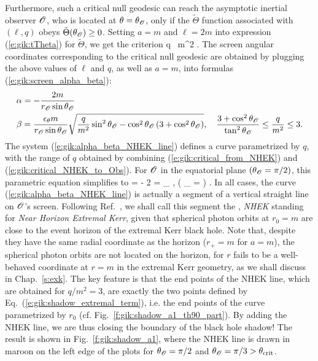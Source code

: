 Furthermore, such a critical null geodesic can reach the asymptotic inertial
observer $\mathscr{O}$, who is located at $\theta = \theta_{\mathscr{O}}$, only if the
$\tilde{\Theta}$ function associated with $(\ell,q)$ obeys $\tilde{\Theta}(\theta_{\mathscr{O}}) \geq 0$.
Setting $a=m$ and $\ell=2m$ into expression (\ref{e:gik:tTheta}) for $\tilde{\Theta}$,
we get the criterion
\be \label{e:gik:critical_NHEK_to_Obs}
    q \geq {} \, m^2 .
\ee
The screen angular coordinates corresponding to the critical null geodesic
are obtained by plugging the
above values of $\ell$ and $q$, as well as $a=m$, into formulas (\ref{e:gik:screen_alpha_beta}):
\begin{subequations}
\label{e:gik:alpha_beta_NHEK_line}
\begin{align}
& \alpha = - \frac{2 m}{r_{\mathscr{O}}\sin\theta_{\mathscr{O}}}  \\
&  \beta = \frac{\epsilon_\theta m}{r_{\mathscr{O}}\sin\theta_{\mathscr{O}}} \sqrt{ \frac{q}{m^2}\sin^2\theta_{\mathscr{O}}
 - \cos^2\theta_{\mathscr{O}} \left( 3 + \cos^2\theta_{\mathscr{O}} \right)  },
 \quad \frac{3 + \cos^2\theta_{\mathscr{O}}}{\tan^2\theta_{\mathscr{O}}}  \leq \frac{q}{m^2} \leq 3 .
\end{align}
\end{subequations}
The system (\ref{e:gik:alpha_beta_NHEK_line}) defines a curve parametrized by $q$,
with the range of $q$ obtained by combining (\ref{e:gik:critical_from_NHEK}) and (\ref{e:gik:critical_NHEK_to_Obs}).
For $\mathscr{O}$ in the equatorial plane $(\theta_{\mathscr{O}} = \pi/2)$, this parametric equation
simplifies to
\be
    \alpha = - 2 
    \qand
    \beta = \eps_\th {} ,
     \leq {}   \qquad\left( \th_{\Obs} =  \right) .
\ee
In all cases, the curve (\ref{e:gik:alpha_beta_NHEK_line})
is actually a segment of a vertical straight line on $\mathscr{O}$'s screen. Following Ref.~\cite{GrallLS18},
we shall call this segment the , \emph{NHEK} standing
for \emph{Near Horizon Extremal Kerr}, given that spherical photon orbits
at $r_0=m$ are close to the event horizon of the extremal Kerr black hole.
Note that, despite they have the same radial coordinate as the horizon ($r_+=m$ for $a=m$),
the spherical photon orbits are not located
on the horizon, for $r$ fails to be a well-behaved coordinate at $r=m$ in
the extremal Kerr geometry, as we shall discuss in Chap.~\ref{s:exk}.
The key feature is that the end points
of the NHEK line, which are obtained for $q/m^2 = 3$,
are exactly the two points defined by Eq.~(\ref{e:gik:shadow_extremal_term}),
i.e. the end points of the curve parametrized by $r_0$ (cf. Fig.~\ref{f:gik:shadow_a1_th90_part}).
By adding the NHEK line, we are thus
closing the boundary of the black hole shadow! The result is shown in Fig.~\ref{f:gik:shadow_a1},
where the NHEK line is drawn in maroon on the left edge of the plots
for $\theta_{\mathscr{O}} = \pi/2$ and $\theta_{\mathscr{O}} = \pi/3 > \theta_{\rm crit}$.

